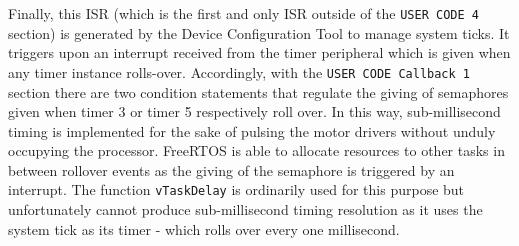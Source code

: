 Finally, this ISR (which is the first and only ISR outside of the \verb|USER CODE 4| section) is generated by the Device Configuration Tool to manage system ticks. It triggers upon an interrupt received from the timer peripheral which is given when any timer instance rolls-over. Accordingly, with the \verb|USER CODE Callback 1| section there are two condition statements that regulate the giving of semaphores given when timer 3 or timer 5 respectively roll over. In this way, sub-millisecond timing is implemented for the sake of pulsing the motor drivers without unduly occupying the processor. FreeRTOS is able to allocate resources to other tasks in between rollover events as the giving of the semaphore is triggered by an interrupt. The function \verb|vTaskDelay| is ordinarily used for this purpose but unfortunately cannot produce sub-millisecond timing resolution as it uses the system tick as its timer - which rolls over every one millisecond.

